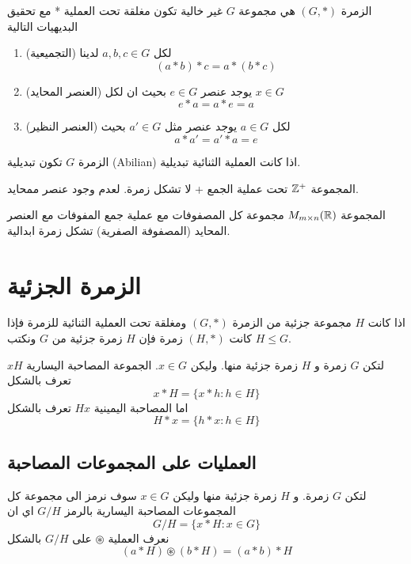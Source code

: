 \begin{definition}
	الزمرة $(G, *)$ هي مجموعة $G$ غير خالية تكون مغلقة تحت العملية * مع تحقيق البديهيات التالية
	\begin{enumerate}
		\item (التجميعية) لكل $a, b, c\in G$ لدينا
		\[
		(a*b) * c = a*(b*c)
		\]
		\item (العنصر المحايد) يوجد عنصر $e\in G$ بحيث ان لكل $x\in G$ 
		\[
		e * a = a * e = a
		\]
		\item (العنصر النظير)  لكل $a\in G$ يوجد عنصر مثل $a' \in G$ بحيث 
		\[
		a * a' = a' * a = e
		\]
	\end{enumerate}
\end{definition}

\begin{definition}
	الزمرة $G$ تكون تبديلية (Abilian) اذا كانت العملية الثنائية تبديلية.
\end{definition}

\begin{example}
	المجموعة $\mathbb{Z}^+$ تحت عملية الجمع + لا تشكل زمرة. لعدم وجود عنصر ممحايد.
\end{example}

\begin{example}
	المجموعة $M_{m\times n}(\mathbb{R})$ مجموعة كل المصفوفات مع عملية جمع المفوفات مع العنصر المحايد (المصفوفة الصفرية) تشكل زمرة ابدالية.
\end{example}

\section{الزمرة الجزئية}

\begin{definition}
	اذا كانت $H$ مجموعة جزئية من الزمرة $(G, *)$ ومغلقة تحت العملية الثنائية للزمرة فإذا كانت $(H, *)$ زمرة فإن $H$ زمرة جزئية من $G$ ونكتب $H\leq G$.
\end{definition}

\begin{definition}
	لتكن $G$ زمرة و $H$ زمرة جزئية منها. وليكن $x\in G$. الجموعة المصاحبة اليسارية $xH$ تعرف بالشكل
	\[
	x*H = \{x*h : h \in H\}
	\]
	اما المصاحبة اليمينية $Hx$ تعرف بالشكل
	\[
	H*x = \{ h*x : h\in H\} 
	\]
\end{definition}

\subsection*{العمليات على المجموعات المصاحبة \cite{abstract_algebra3}}
لتكن $G$ زمرة. و $H$ زمرة جزئية منها وليكن $x\in G$ سوف نرمز الى مجموعة كل المجموعات المصاحبة اليسارية بالرمز $G/H$ اي ان 
\[
G/H = \{x*H : x\in G\}
\]
نعرف العملية $\circledast$ على $G/H$ بالشكل
\[
(a*H)\circledast(b*H) = (a*b)*H
\]

